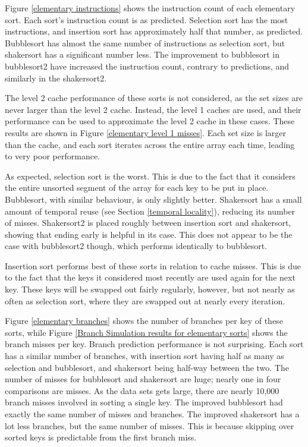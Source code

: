 Figure \ref{elementary instructions} shows the instruction count of each
elementary sort. Each sort's instruction count is as predicted. Selection sort
has the most instructions, and insertion sort has approximately half that
number, as predicted. Bubblesort has almost the same number of instructions as
selection sort, but shakersort has a significant number less. The improvement to
bubblesort in bubblesort2 have increased the instruction count, contrary to
predictions, and similarly in the shakersort2.

The level 2 cache performance of these sorts is not considered, as the set sizes
are never larger than the level 2 cache. Instead, the level 1 caches are used,
and their performance can be used to approximate the level 2 cache in these
cases. These results are shown in Figure \ref{elementary level 1 misses}. Each
set size is larger than the cache, and each sort iterates across the entire
array each time, leading to very poor performance.

As expected, selection sort is the worst. This is due to the fact that it
considers the entire unsorted segment of the array for each key to be put in
place. Bubblesort, with similar behaviour, is only slightly better. Shakersort
has a small amount of temporal reuse (see Section \ref{temporal locality}),
reducing its number of misses. Shakersort2 is placed roughly between insertion
sort and shakersort, showing that ending early is helpful in its case. This does
not appear to be the case with bubblesort2 though, which performs identically to
bubblesort.

Insertion sort performs best of these sorts in relation to cache misses. This
is due to the fact that the keys it considered most recently are used again for
the next key. These keys will be swapped out fairly regularly, however, but not
nearly as often as selection sort, where they are swapped out at nearly every
iteration.

Figure \ref{elementary branches} shows the number of branches per key of these
sorts, while Figure \ref{Branch Simulation results for elementary sorts} shows
the branch misses per key.  Branch prediction performance is not surprising.
Each sort has a similar number of branches, with insertion sort having half as
many as selection and bubblesort, and shakersort being half-way between the
two. The number of misses for bubblesort and shakersort are huge; nearly one in
four comparisons are misses. As the data sets gets large, there are nearly
10,000 branch misses involved in sorting a single key. The improved bubblesort
had exactly the same number of misses and branches. The improved shakersort has
a lot less branches, but the same number of misses. This is because skipping
over sorted keys is predictable from the first branch miss.

